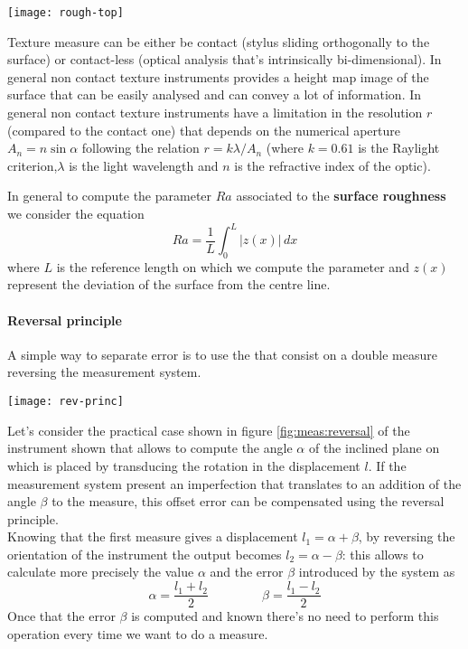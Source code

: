 	\begin{SCfigure}[2][bht]
		\centering \texttt{[image: rough-top]}
		\caption{topology, form and texture surface for a piecea.}
	\end{SCfigure}

	Texture measure can be either be contact (stylus sliding orthogonally to the surface) or contact-less (optical analysis that's intrinsically bi-dimensional). In general non contact texture instruments provides a height map image of the surface that can be easily analysed and can convey a lot of information. In general non contact texture instruments have a limitation in the resolution $r$ (compared to the contact one) that depends on the numerical aperture $A_n = n \sin\alpha$ following the relation $r = k \lambda /A_n$ (where $k=0.61$ is the Raylight criterion,$\lambda$ is the light wavelength and $n$ is the refractive index of the optic).
	
	In general to compute the parameter $Ra$ associated to the \textbf{surface roughness} we consider the equation
	\begin{equation}
		Ra = \frac 1 L \int_0^L |z(x)| \, dx
	\end{equation}
	where $L$ is the reference length on which we compute the parameter and $z(x)$ represent the deviation of the surface from the centre line.
	
	\paragraph{Reversal principle} A simple way to separate error is to use the  that consist on a double measure reversing the measurement system.
	
	\begin{SCfigure}[2][bht]
		\centering \texttt{[image: rev-princ]}
		\caption{application on where the reversal principle can be useful.}
		\label{fig:meas:reversal}
	\end{SCfigure}
	
	Let's consider the practical case shown in figure \ref{fig:meas:reversal} of the instrument shown that allows to compute the angle $\alpha$ of the inclined plane on which is placed by transducing the rotation in the displacement $l$. If the measurement system present an imperfection that translates to an addition of the angle $\beta$ to the measure, this offset error can be compensated using the reversal principle.\\
	Knowing that the first measure gives a displacement $l_1 = \alpha + \beta$, by reversing the orientation of the instrument the output becomes $l_2 = \alpha - \beta$: this allows to calculate more precisely the value $\alpha$ and the error $\beta$ introduced by the system as
	\[ \alpha = \frac{l_1 + l_2}{2} \qquad \ \qquad \beta = \frac{l_1-l_2}{2} \]
	Once that the error $\beta$ is computed and known there's no need to perform this operation every time we want to do a measure.

